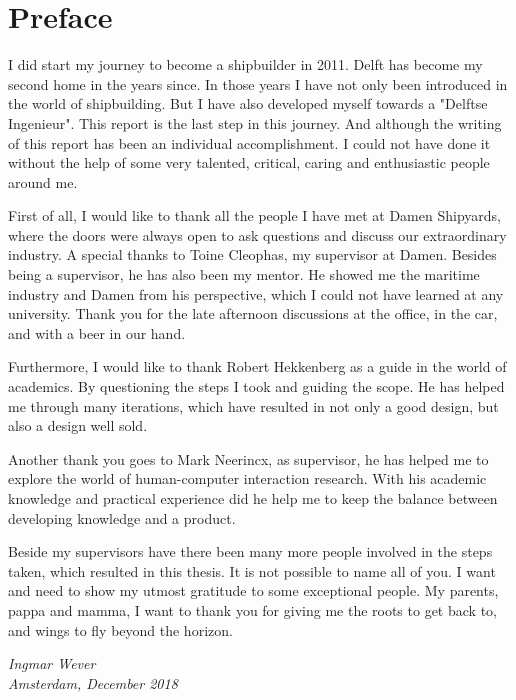 \chapter{Preface}
I did start my journey to become a shipbuilder in 2011. Delft has become my second home in the years since. In those years I have not only been introduced in the world of shipbuilding. But I have also developed myself towards a "Delftse Ingenieur". This report is the last step in this journey. And although the writing of this report has been an individual accomplishment. I could not have done it without the help of some very talented, critical, caring and enthusiastic people around me.

First of all, I would like to thank all the people I have met at Damen Shipyards, where the doors were always open to ask questions and discuss our extraordinary industry. A special thanks to Toine Cleophas, my supervisor at Damen. Besides being a supervisor, he has also been my mentor. He showed me the maritime industry and Damen from his perspective, which I could not have learned at any university. Thank you for the late afternoon discussions at the office, in the car, and with a beer in our hand.

Furthermore, I would like to thank Robert Hekkenberg as a guide in the world of academics. By questioning the steps I took and guiding the scope. He has helped me through many iterations, which have resulted in not only a good design, but also a design well sold.

Another thank you goes to Mark Neerincx, as supervisor, he has helped me to explore the world of human-computer interaction research. With his academic knowledge and practical experience did he help me to keep the balance between developing knowledge and a product.

Beside my supervisors have there been many more people involved in the steps taken, which resulted in this thesis. It is not possible to name all of you.
I want and need to show my utmost gratitude to some exceptional people. My parents, pappa and mamma, I want to thank you for giving me the roots to get back to, and wings to fly beyond the horizon.\\


\begin{flushright}
	\textit{Ingmar Wever\\
		Amsterdam, December 2018}
\end{flushright}